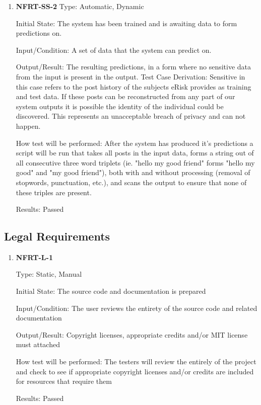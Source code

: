 \documentclass[12pt, titlepage]{article}
\begin{document}
\begin{enumerate}


\item \textbf{NFRT-SS-2}
 Type: Automatic, Dynamic
          
Initial State: The system has been trained and is awaiting data to form predictions on.
          
Input/Condition: A set of data that the system can predict on.
          
Output/Result: The resulting predictions, in a form where no sensitive data from the input is present in the output.
 Test Case Derivation: Sensitive in this case refers to the post history of the subjects eRisk provides as training and test data. If these posts can be reconstructed from any part of our system outputs it is possible the identity of the individual could be discovered. This represents an unacceptable breach of privacy and can not happen.
          
How test will be performed: After the system has produced it's predictions a script will be run that takes all posts in the input data, forms a string out of all consecutive three word triplets (ie. "hello my good friend" forms "hello my good" and "my good friend"), both with and without processing (removal of stopwords, punctuation, etc.), and scans the output to ensure that none of these triples are present.


Results: Passed
 \end{enumerate}


\subsection{Legal Requirements}


\begin{enumerate}


\item \textbf{NFRT-L-1}


Type: Static, Manual
        
Initial State: The source code and documentation is prepared
        
Input/Condition: The user reviews the entirety of the source code and related documentation
        
Output/Result: Copyright licenses, appropriate credits and/or MIT license must attached
        
How test will be performed: The testers will review the entirely of the project and check to see if appropriate copyright licenses and/or credits are included for resources that require them


Results: Passed


\end{enumerate}
\end{document}
